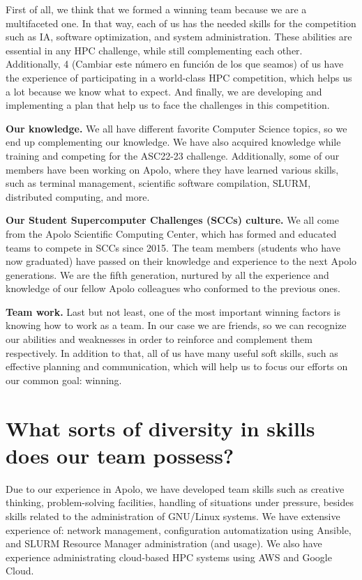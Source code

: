 \documentclass[11pt,a4paper,twocolumn]{article}
\begin{document}
First of all, we think that we formed a winning team because we are a multifaceted one. In that way, each of us has the needed skills for the competition such as IA, software optimization, and system administration. These abilities are essential in any HPC challenge, while still complementing each other. Additionally, 4 (Cambiar este número en función de los que seamos) of us have the experience of participating in a world-class HPC competition, which helps us a lot because we know what to expect. And finally, we are developing and implementing a plan that help us to face the challenges in this competition.

\textbf{Our knowledge.} We all have different favorite Computer Science topics, so we end up complementing our knowledge. We have also acquired knowledge while training and competing for the ASC22-23 challenge. Additionally, some of our members have been working on Apolo, where they have learned various skills, such as terminal management, scientific software compilation, SLURM, distributed computing, and more.

\textbf{Our Student Supercomputer Challenges (SCCs) culture.} We all come from the Apolo Scientific Computing Center, which has formed and educated teams to compete in SCCs since 2015. The team members (students who have now graduated) have passed on their knowledge and experience to the next Apolo generations. We are the fifth generation, nurtured by all the experience and knowledge of our fellow Apolo colleagues who conformed to the previous ones.

\textbf{Team work.} Last but not least, one of the most important winning factors is knowing how to work as a team. In our case we are friends, so we can recognize our abilities and weaknesses in order to reinforce and complement them respectively. In addition to that, all of us have many useful soft skills, such as effective planning and communication, which will help us to focus our efforts on our common goal: winning.

\section{What sorts of diversity in skills does our team possess?}

Due to our experience in Apolo, we have developed team skills such as creative thinking, problem-solving facilities, handling of situations under pressure, besides skills related to the administration of GNU/Linux systems. We have extensive experience of: network management, configuration automatization using Ansible, and SLURM Resource Manager administration (and usage). We also have experience administrating cloud-based HPC systems using AWS and Google Cloud.
\end{document}
